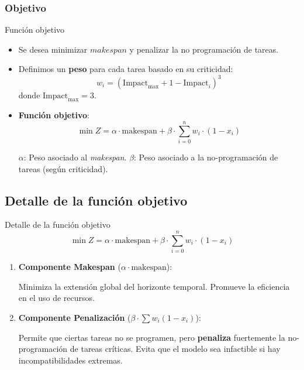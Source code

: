 \documentclass[pdfpagelabels=false, usepdftitle=false, aspectratio=169]{beamer}
\begin{document}
\subsubsection{Objetivo}
\begin{frame}{Función objetivo}
\begin{itemize}
  \item Se desea minimizar \(\textit{makespan}\) y penalizar la no programación de tareas.
  \vfill
  \item Definimos un \textbf{peso} para cada tarea basado en su criticidad:
  \[
  w_i = (\text{Impact}_{\text{max}} + 1 - \text{Impact}_i)^3
  \]
  donde \(\text{Impact}_{\text{max}} = 3\).
  \vfill
  \item \textbf{Función objetivo}:
  \[
  \min Z = \alpha \cdot \text{makespan} 
           + \beta \cdot \sum_{i=0}^{n} w_i \cdot (1 - x_i)
  \]
  \begin{itemize}
      \arrowitem \(\alpha\): Peso asociado al \textit{makespan}.
      \arrowitem \(\beta\): Peso asociado a la no-programación de tareas (según criticidad).
  \end{itemize}
\end{itemize}
\vfill
\end{frame}

\subsection{Detalle de la función objetivo}
\begin{frame}{Detalle de la función objetivo}
    \[
        \min Z = \alpha \cdot \text{makespan} 
                 + \beta \cdot \sum_{i=0}^{n} w_i \cdot (1 - x_i)
        \]
      
\begin{enumerate}
  \item \textbf{Componente Makespan} (\(\alpha \cdot \text{makespan}\)):
  \begin{itemize}
    \arrowitem Minimiza la extensión global del horizonte temporal.
    \arrowitem Promueve la eficiencia en el uso de recursos.
  \end{itemize}
  \vfill
  \item \textbf{Componente Penalización} (\(\beta \cdot \sum w_i (1 - x_i)\)):
  \begin{itemize}
    \arrowitem Permite que ciertas tareas no se programen, pero \textbf{penaliza} fuertemente la no-programación de tareas críticas.
    \arrowitem Evita que el modelo sea infactible si hay incompatibilidades extremas.
  \end{itemize}
\end{enumerate}
\vfill
\end{frame}
\end{document}

